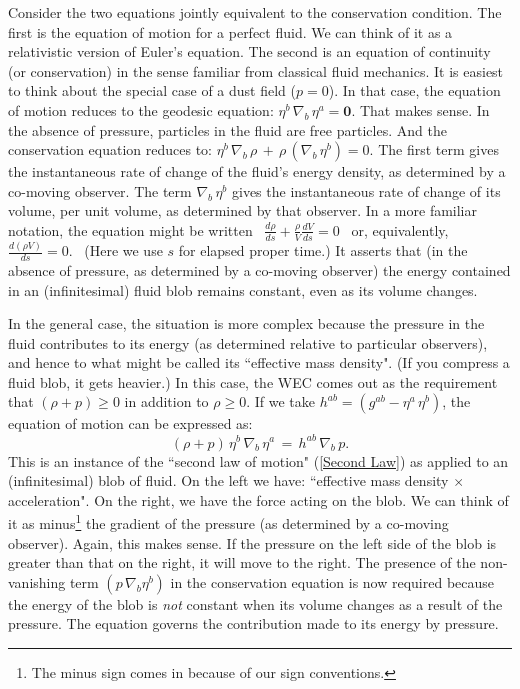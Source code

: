 \documentclass [12] {article}
\theoremstyle{plain}
\numberwithin{figure}{subsection}
\numberwithin{proposition}{subsection}
\begin{document}
Consider the two equations jointly equivalent to the conservation condition.  The first is the equation of motion for a perfect fluid. We can think of it as a relativistic version of Euler's equation.  The second is an equation of continuity (or conservation) in the sense familiar from classical fluid mechanics.  It is easiest to think about the special case of a dust field ($p = 0$). In that case, the equation of motion reduces to the geodesic equation: $\eta^b \, \nabla_b  \, \eta^a  = \textbf{0}$. That makes sense. In the absence of pressure, particles in the fluid are free particles.    And the conservation  equation reduces to: 
$\eta^b \, \nabla_b  \, \rho  \, + \,  \rho  \, (\nabla_b  \, \eta^b) = 0$. The first term gives the instantaneous rate of change of the fluid's energy density, as determined by a co-moving observer. The term $\nabla_b  \, \eta^b$ gives the instantaneous rate of change of its volume, per unit volume,  as determined by that observer.   In a more familiar notation, the equation might be written \ 
$\displaystyle\frac{d\rho}{ds} + \frac{\rho}{V} \frac{dV}{ds} = 0$ \  or, equivalently,  \ $\displaystyle \frac{d(\rho V)}{ds} = 0$. \ (Here we use $s$ for elapsed proper time.) It asserts that (in the absence of pressure, as determined by a co-moving observer)  the energy contained in an (infinitesimal)  fluid blob remains constant, even as its volume changes.  %
  
In the general case, the situation is more complex because the pressure in the fluid contributes to its energy (as determined relative to particular observers), and hence to what might be called its ``effective mass density". (If you compress a fluid blob, it gets heavier.)  In this case, the WEC comes out as the requirement that $(\rho + p) \geq 0$ in addition to $\rho \geq 0$. If we take $h^{ab} = (g^{ab} - \eta^a \, \eta^b)$, the equation of motion  can be expressed as:  
%
\begin{equation*}
(\rho + p) \, \eta^b \, \nabla_b  \, \eta^a  \, = \,   h^{ab}  \, \nabla_b  \, p.
\end{equation*}
%
This is an instance of the ``second law of motion" (\ref{Second Law}) as applied to an (infinitesimal) blob of fluid.  On the left we have:   ``effective mass density  $\times$   acceleration". On the right, we have the force acting on the blob. We can think of it as minus\footnote{The minus sign comes in because of our sign conventions.} the gradient of the pressure (as determined by a co-moving observer).  Again, this makes sense. If the pressure on the left side of the blob is greater than that on the right, it will move to the right. The presence of  the non-vanishing term  $(p \, \nabla_b  \eta^b)$ in the conservation equation is now required because the energy of the blob is \emph{not} constant when its volume changes as a result of the pressure.  The equation governs the contribution made to its energy by pressure.
\end{document}
